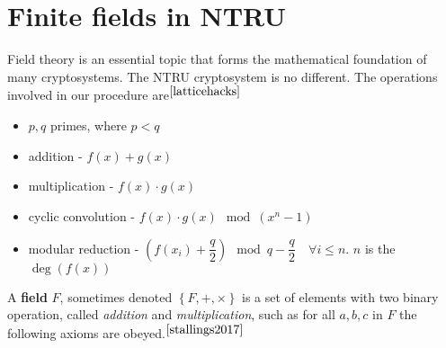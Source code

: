\documentclass[a4paper,12pt]{article}
\begin{document}
\section{Finite fields in NTRU}
\begin{flushleft}
Field theory is an essential topic that forms the mathematical foundation of many cryptosystems. The NTRU cryptosystem is no different. The operations involved in our procedure are$^{\cite{latticehacks}}$

\begin{itemize}
	\item $p,q$ primes, where $p<q$
	\item addition - $f(x)+g(x)$
	\item multiplication - $f(x)\cdot g(x)$
	\item cyclic convolution - $f(x)\cdot g(x) \mod (x^n-1)$
	\item modular reduction - $\left(f(x_i)+\dfrac q2\right)\mod q - \dfrac q2 \quad \forall i\le n$. $n$ is the $\deg(f(x))$
\end{itemize}
\end{flushleft}

\begin{flushleft}
A \textbf{field} $F$, sometimes denoted $\left\{F,+,\times\right\}$ is a set of elements with two binary operation, called \textit{addition} and \textit{multiplication}, such as for all $a,b,c$ in $F$ the following axioms are obeyed.$^{\cite{stallings2017}}$
\end{flushleft}
\end{document}
